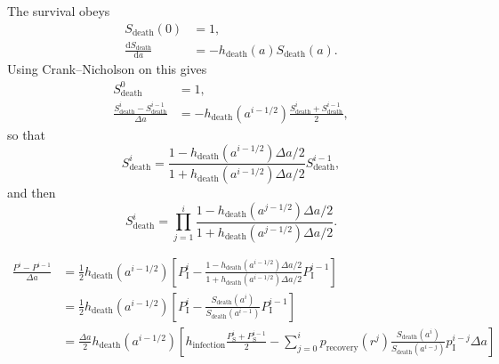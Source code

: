 \documentclass[12pt]{article}
\newcommand{\md}{\mathrm{d}}
\begin{document}
The survival obeys
\begin{subequations}
  \begin{align}
    S_{\text{death}}(0)
    &= 1,
    \\
    \frac{\md S_{\text{death}}}{\md a}
    &= - h_{\text{death}}(a) S_{\text{death}}(a).
  \end{align}
\end{subequations}
Using Crank--Nicholson on this gives
\begin{subequations}
  \begin{align}
    S_{\text{death}}^0
    &= 1,
    \\
    \frac{S_{\text{death}}^i - S_{\text{death}}^{i - 1}}{\Delta a}
    &= - h_{\text{death}}(a^{i - 1 / 2})
      \frac{S_{\text{death}}^i + S_{\text{death}}^{i - 1}}{2},
  \end{align}
\end{subequations}
so that
\begin{equation}
  S_{\text{death}}^i
  = \frac{1 - h_{\text{death}}(a^{i - 1 / 2}) \Delta a / 2}
  {1 + h_{\text{death}}(a^{i - 1 / 2}) \Delta a / 2}
  S_{\text{death}}^{i - 1},
\end{equation}
and then
\begin{equation}
  S_{\text{death}}^i
  =
  \prod_{j = 1}^i
  \frac{1 - h_{\text{death}}(a^{j - 1 / 2}) \Delta a / 2}
  {1 + h_{\text{death}}(a^{j - 1 / 2}) \Delta a / 2}.
\end{equation}

\begin{equation}
  \begin{split}
    \frac{P^i - P^{i - 1}}{\Delta a}
    &=
    \frac{1}{2} h_{\text{death}}(a^{i - 1 / 2})
    \left[
      P_{\mathrm{I}}^i
      - \frac{1 - h_{\text{death}}(a^{i - 1 / 2}) \Delta a / 2}
      {1 + h_{\text{death}}(a^{i - 1 / 2}) \Delta a / 2}
      P_{\mathrm{I}}^{i - 1}
    \right]
    \\
    &=
    \frac{1}{2} h_{\text{death}}(a^{i - 1 / 2})
    \left[
      P_{\mathrm{I}}^i
      - \frac{S_{\text{death}}(a^i)}{S_{\text{death}}(a^{i - 1})}
      P_{\mathrm{I}}^{i - 1}
    \right]
    \\
    &=
    \frac{\Delta a}{2} h_{\text{death}}(a^{i - 1 / 2})
    \left[
      h_{\text{infection}}
      \frac{P_{\mathrm{S}}^i + P_{\mathrm{S}}^{i - 1}}{2}
      - \sum_{j = 0}^i
      p_{\text{recovery}}(r^j)
      \frac{S_{\text{death}}(a^i)}{S_{\text{death}}(a^{i - j})}
      p_{\mathrm{I}}^{i - j}
      \Delta a
    \right]
  \end{split}
\end{equation}
\end{document}
